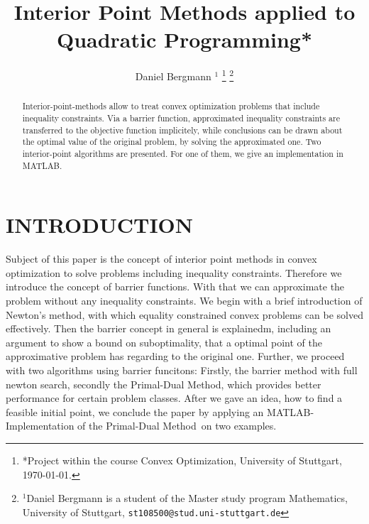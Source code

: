 \documentclass[a4paper, 10pt, conference]{ieeeconf}      %
\title{\LARGE \bf Interior Point Methods applied to Quadratic Programming*}
\author{Daniel Bergmann $^{1}$%
\thanks{*Project within the course Convex Optimization, University of Stuttgart, \today.}%
\thanks{$^{1}$Daniel Bergmann is a student of the Master study program Mathematics, University of Stuttgart,
        {\tt\small st108500@stud.uni-stuttgart.de}}%
}
\newcommand{\matlab}{MATLAB}
\newcommand{\pdm}{Primal-Dual Method}
\begin{document}
\maketitle
\thispagestyle{empty}
\pagestyle{empty}


\begin{abstract}
Interior-point-methods allow to treat convex optimization problems that include inequality constraints. Via a barrier function, approximated inequality constraints are transferred to the objective function implicitely, while conclusions can be drawn about the optimal value of the original problem, by solving the approximated one. Two interior-point algorithms are presented. For one of them, we give an implementation in \matlab.

\end{abstract}


\section{INTRODUCTION}
%
%
%
%

Subject of this paper is the concept of interior point methods in convex optimization to solve problems including inequality constraints. Therefore we introduce the concept of barrier functions. With that we can approximate the problem without any inequality constraints. We begin with a brief introduction of Newton's method, with which equality constrained convex problems can be solved effectively. Then the barrier concept in general is explainedm, including an argument to show a bound on suboptimality, that a optimal point of the approximative problem has regarding to the original one. Further, we proceed with two algorithms using barrier funcitons: Firstly, the barrier method with full newton search, secondly the \pdm, which provides better performance for certain problem classes. After we gave an idea, how to find a feasible initial point, we conclude the paper by applying an \matlab-Implementation of the \pdm \ on two examples.
\end{document}
